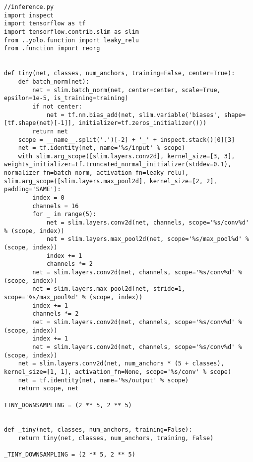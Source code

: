 \begin{lstlisting}
//inference.py
import inspect
import tensorflow as tf
import tensorflow.contrib.slim as slim
from ..yolo.function import leaky_relu
from .function import reorg


def tiny(net, classes, num_anchors, training=False, center=True):
    def batch_norm(net):
        net = slim.batch_norm(net, center=center, scale=True, epsilon=1e-5, is_training=training)
        if not center:
            net = tf.nn.bias_add(net, slim.variable('biases', shape=[tf.shape(net)[-1]], initializer=tf.zeros_initializer()))
        return net
    scope = __name__.split('.')[-2] + '_' + inspect.stack()[0][3]
    net = tf.identity(net, name='%s/input' % scope)
    with slim.arg_scope([slim.layers.conv2d], kernel_size=[3, 3], weights_initializer=tf.truncated_normal_initializer(stddev=0.1), normalizer_fn=batch_norm, activation_fn=leaky_relu), slim.arg_scope([slim.layers.max_pool2d], kernel_size=[2, 2], padding='SAME'):
        index = 0
        channels = 16
        for _ in range(5):
            net = slim.layers.conv2d(net, channels, scope='%s/conv%d' % (scope, index))
            net = slim.layers.max_pool2d(net, scope='%s/max_pool%d' % (scope, index))
            index += 1
            channels *= 2
        net = slim.layers.conv2d(net, channels, scope='%s/conv%d' % (scope, index))
        net = slim.layers.max_pool2d(net, stride=1, scope='%s/max_pool%d' % (scope, index))
        index += 1
        channels *= 2
        net = slim.layers.conv2d(net, channels, scope='%s/conv%d' % (scope, index))
        index += 1
        net = slim.layers.conv2d(net, channels, scope='%s/conv%d' % (scope, index))
    net = slim.layers.conv2d(net, num_anchors * (5 + classes), kernel_size=[1, 1], activation_fn=None, scope='%s/conv' % scope)
    net = tf.identity(net, name='%s/output' % scope)
    return scope, net

TINY_DOWNSAMPLING = (2 ** 5, 2 ** 5)


def _tiny(net, classes, num_anchors, training=False):
    return tiny(net, classes, num_anchors, training, False)

_TINY_DOWNSAMPLING = (2 ** 5, 2 ** 5)



\end{lstlisting}
